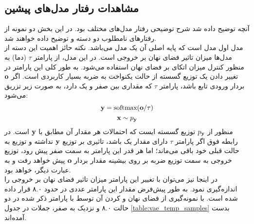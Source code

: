 \subsection{مشاهدات رفتار مدل‌های پیشین}
آنچه توضیح داده شد شرح توضیحی رفتار مدل‌های مختلف بود. در این بخش دو نمونه از رفتارهای نامطلوب دو دسته \gan{} و \vae{} توضیح داده خواهند شد.
\\
مدل اول مدل \towardctg{} است که پایه اصلی آن یک مدل \vae{} می‌باشد. نکته حائز اهمیت این دسته از مدل‌ها میزان تاثیر فضای نهان بر خروجی \decoder{} است. در این مدل، از پارامتر $\tau$ (دما) به منظور کنترل میزان اتکای \decoder{} بر فضای نهان استفاده می‌شود. به طور کلی این پارامتر در تغییر دادن یک توزیع گسسته از حالت یکنواخت به ضربه بسیار کاربردی است. اگر ${\bf o}$ بردار ورودی تابع \softmax{} باشد، پارامتر $\tau{}$ که مقداری بین صفر و یک دارد، به صورت زیر تزریق می‌شود:
\begin{gather}
	{\bf y} = \text{softmax}({\bf o}/\tau) \\
	{\bf x} \sim p_{\bf y} \nonumber
\end{gather}
منظور از $p_{\bf y}$ توزیع گسسته ایست که احتمالات هر مقدار آن مطابق با ${\bf y}$ است. در رابطه فوق اگر پارامتر $\tau$ دارای مقدار یک باشد، تاثیری بر توزیع ${\bf y}$ نداشته و توزیع به حالت قبلی خود باقی می‌ماند؛ اما هر قدر این پارامتر به سمت صفر پیش رود، توزیع خروجی \softmax{} به سمت توزیع ضربه بر روی بیشینه مقدار بردار ${\bf o}$ پیش خواهد رفت و به عبارت دیگر، \greedydecoding{} خواهد بود. \\
در اینجا نیز می‌توان با تغییر این پارامتر میزان تاثیر فضای نهان بر خروجی \decoder{} را اندازه‌گیری نمود. به طور پیش‌فرض مقدار این پارامتر عددی در حدود ۸.۰ قرار داده شده است. با نمونه‌گیری از فضای نهان و \decode{} کردن آن توسط \decoder{} با پارامتر ذکر شده در دو حالت ۸.۰ و نزدیک به صفر، جملات در جدول 
\ref{table:vae_temp_samples}
بدست آمده‌اند.
